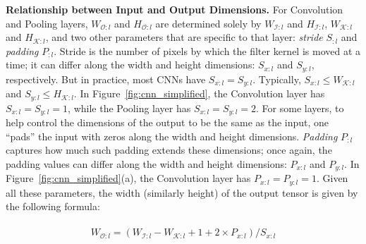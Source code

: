 
\vspace{2mm}
\noindent \textbf{Relationship between Input and Output Dimensions.}
For Convolution and Pooling layers, $W_{\mathcal{O}:l}$ and $H_{\mathcal{O}:l}$ are determined solely by $W_{\mathcal{I}:l}$ and $H_{\mathcal{I}:l}$, $W_{\mathcal{K}:l}$ and $H_{\mathcal{K}:l}$, and two other parameters that are specific to that layer: \textit{stride} $S_{:l}$ and \textit{padding} $P_{:l}$. Stride is the number of pixels by which the filter kernel is moved at a time; it can differ along the width and height dimensions: $S_{x:l}$ and $S_{y:l}$, respectively. But in practice, most CNNs have $S_{x:l} = S_{y:l}$. Typically, $S_{x:l} \leq W_{\mathcal{K}:l}$ and $S_{y:l} \leq H_{\mathcal{K}:l}$. In Figure~\ref{fig:cnn_simplified}, the Convolution layer has $S_{x:l} = S_{y:l} = 1$, while the Pooling layer has $S_{x:l} = S_{y:l} = 2$. For some layers, to help control the dimensions of the output to be the same as the input, one ``pads'' the input with zeros along the width and height dimensions. \textit{Padding} $P_{:l}$ captures how much such padding extends these dimensions; once again, the padding values can differ along the width and height dimensions: $P_{x:l}$ and $P_{y:l}$. In Figure~\ref{fig:cnn_simplified}(a), the Convolution layer has $P_{x:l} = P_{y:l} = 1$. Given all these parameters, the width (similarly height) of the output tensor is given by the following formula:

\vspace{-4mm}
\begin{align}
\begin{split}
W_{\mathcal{O}:l} = (W_{\mathcal{I}:l} - W_{\mathcal{K}:l} + 1 + 2\times P_{x:l})/S_{x:l} \\
\end{split}
\end{align}

